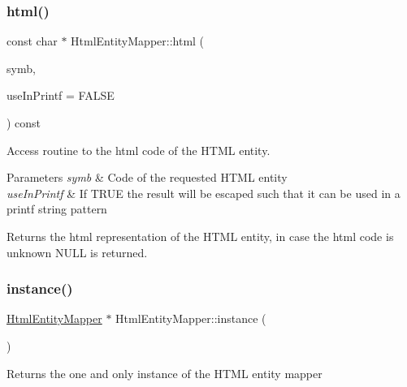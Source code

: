 \subsubsection{\texorpdfstring{html()}{html()}}
{\footnotesize\ttfamily const char $\ast$ Html\+Entity\+Mapper\+::html (\begin{DoxyParamCaption}\item[{Doc\+Symbol\+::\+Sym\+Type}]{symb,  }\item[{bool}]{use\+In\+Printf = {\ttfamily FALSE} }\end{DoxyParamCaption}) const}



Access routine to the html code of the H\+T\+ML entity. 


\begin{DoxyParams}{Parameters}
{\em symb} & Code of the requested H\+T\+ML entity \\
\hline
{\em use\+In\+Printf} & If T\+R\+UE the result will be escaped such that it can be used in a printf string pattern \\
\hline
\end{DoxyParams}
\begin{DoxyReturn}{Returns}
the html representation of the H\+T\+ML entity, in case the html code is unknown {\ttfamily N\+U\+LL} is returned. 
\end{DoxyReturn}
\mbox{\label{class_html_entity_mapper_ae6ddba77b763691a6e3a1c9021e8d944}} 
\subsubsection{\texorpdfstring{instance()}{instance()}}
{\footnotesize\ttfamily \mbox{\hyperlink{class_html_entity_mapper}{Html\+Entity\+Mapper}} $\ast$ Html\+Entity\+Mapper\+::instance (\begin{DoxyParamCaption}{ }\end{DoxyParamCaption})\hspace{0.3cm}{\ttfamily [static]}}

Returns the one and only instance of the H\+T\+ML entity mapper \mbox{\label{class_html_entity_mapper_ae1a658dacc27f6300042318c4dda97cf}} 
